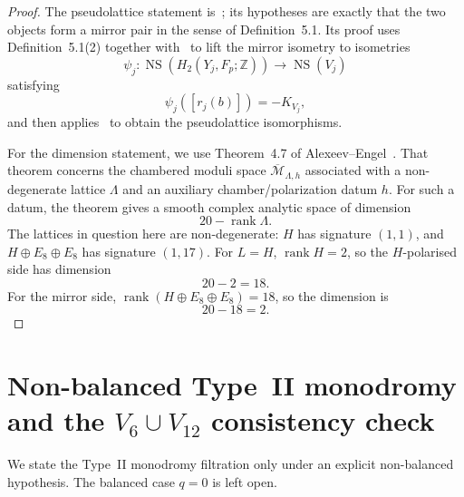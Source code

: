 \documentclass[12pt]{article}
\theoremstyle{plain}
\theoremstyle{definition}
\DeclareMathOperator{\rank}{rank}
\DeclareMathOperator{\NS}{NS}
\newcommand{\bZ}{\mathbb{Z}}
\newcommand{\cM}{\mathcal{M}}
\begin{document}
\begin{proof}
The pseudolattice statement is~\cite[Theorem~5.4]{GT24}; its hypotheses are exactly that the two objects form a mirror pair in the sense of Definition~5.1.  Its proof uses Definition~5.1(2) together with~\cite[Proposition~2.37]{GT24} to lift the mirror isometry to isometries
\[
\psi_j\colon \NS(H_2(Y_j,F_p;\bZ))\to \NS(V_j)
\]
satisfying
\[
\psi_j([r_j(b)])=-K_{V_j},
\]
and then applies~\cite[Proposition~2.21]{GT24} to obtain the pseudolattice isomorphisms.

For the dimension statement, we use Theorem~4.7 of Alexeev--Engel~\cite{AE25}.  That theorem concerns the chambered moduli space $\overline{\cM}_{\Lambda,h}$ associated with a non-degenerate lattice $\Lambda$ and an auxiliary chamber/polarization datum $h$.  For such a datum, the theorem gives a smooth complex analytic space of dimension
\[
20-\rank \Lambda.
\]
The lattices in question here are non-degenerate: $H$ has signature $(1,1)$, and $H\oplus E_8\oplus E_8$ has signature $(1,17)$.  For $L=H$, $\rank H=2$, so the $H$-polarised side has dimension
\[
20-2=18.
\]
For the mirror side, $\rank(H\oplus E_8\oplus E_8)=18$, so the dimension is
\[
20-18=2.
\]
\end{proof}

\section{Non-balanced Type~II monodromy and the $V_6\cup V_{12}$ consistency check}

We state the Type~II monodromy filtration only under an explicit non-balanced hypothesis.  The balanced case $q=0$ is left open.
\end{document}
